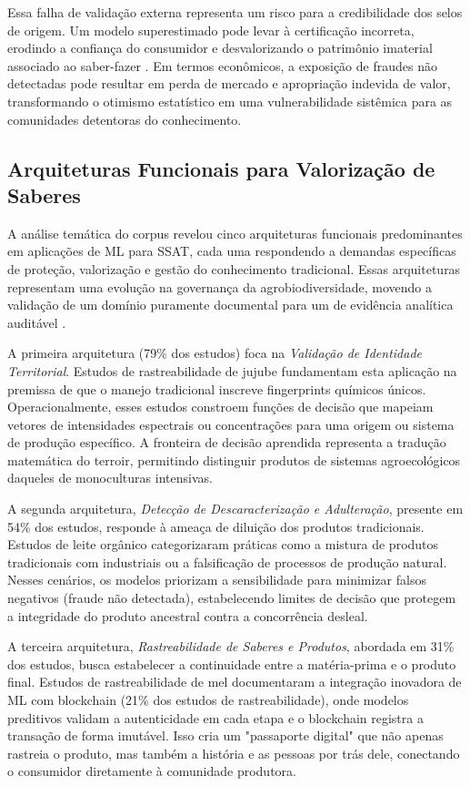 Essa falha de validação externa representa um risco para a credibilidade dos selos de origem. Um modelo superestimado pode levar à certificação incorreta, erodindo a confiança do consumidor e desvalorizando o patrimônio imaterial associado ao saber-fazer  \cite{He2024}. Em termos econômicos, a exposição de fraudes não detectadas pode resultar em perda de mercado e apropriação indevida de valor, transformando o otimismo estatístico em uma vulnerabilidade sistêmica para as comunidades detentoras do conhecimento.

\subsection{Arquiteturas Funcionais para Valorização de Saberes}

A análise temática do corpus revelou cinco arquiteturas funcionais predominantes em aplicações de ML para SSAT, cada uma respondendo a demandas específicas de proteção, valorização e gestão do conhecimento tradicional. Essas arquiteturas representam uma evolução na governança da agrobiodiversidade, movendo a validação de um domínio puramente documental para um de evidência analítica auditável  \cite{Zhang2024}.

A primeira arquitetura (79\% dos estudos) foca na \textit{Validação de Identidade Territorial}. Estudos de rastreabilidade de jujube fundamentam esta aplicação na premissa de que o manejo tradicional inscreve fingerprints químicos únicos. Operacionalmente, esses estudos constroem funções de decisão que mapeiam vetores de intensidades espectrais ou concentrações para uma origem ou sistema de produção específico. A fronteira de decisão aprendida representa a tradução matemática do terroir, permitindo distinguir produtos de sistemas agroecológicos daqueles de monoculturas intensivas.

A segunda arquitetura, \textit{Detecção de Descaracterização e Adulteração}, presente em 54\% dos estudos, responde à ameaça de diluição dos produtos tradicionais. Estudos de leite orgânico categorizaram práticas como a mistura de produtos tradicionais com industriais ou a falsificação de processos de produção natural. Nesses cenários, os modelos priorizam a sensibilidade para minimizar falsos negativos (fraude não detectada), estabelecendo limites de decisão que protegem a integridade do produto ancestral contra a concorrência desleal.

A terceira arquitetura, \textit{Rastreabilidade de Saberes e Produtos}, abordada em 31\% dos estudos, busca estabelecer a continuidade entre a matéria-prima e o produto final. Estudos de rastreabilidade de mel documentaram a integração inovadora de ML com blockchain (21\% dos estudos de rastreabilidade), onde modelos preditivos validam a autenticidade em cada etapa e o blockchain registra a transação de forma imutável. Isso cria um "passaporte digital" que não apenas rastreia o produto, mas também a história e as pessoas por trás dele, conectando o consumidor diretamente à comunidade produtora.


